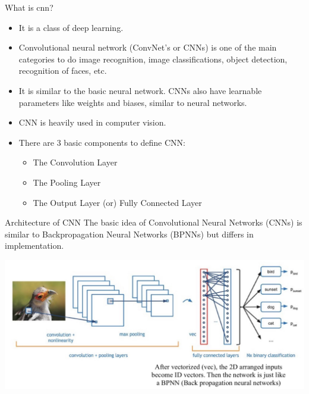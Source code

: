 \documentclass[default, aspectratio=169]{beamer}
\begin{document}
	\begin{frame}{What is cnn?}
		\begin{itemize}
			\item It is a class of deep learning.
			
			\item Convolutional neural network (ConvNet’s or CNNs) is one of the main categories to do image recognition, image classifications, object detection, recognition of faces, etc.
			
			\item It is similar to the basic neural network. CNNs also have learnable parameters like weights and biases, similar to neural networks.
			
			\item CNN is heavily used in computer vision.
			
			\item There are 3 basic components to define CNN:
			\begin{itemize}
				\item The Convolution Layer
				\item The Pooling Layer
				\item The Output Layer (or) Fully Connected Layer
			\end{itemize}
		\end{itemize}
		
	\end{frame}
	\begin{frame}{Architecture of CNN}
		\centering
		The basic idea of Convolutional Neural Networks (CNNs) is similar to Backpropagation Neural Networks (BPNNs) but differs in implementation.
		
		\includegraphics[keepaspectratio, scale=0.5]{pic/Architecture_of_CNN.jpg}
	\end{frame}
\end{document}
